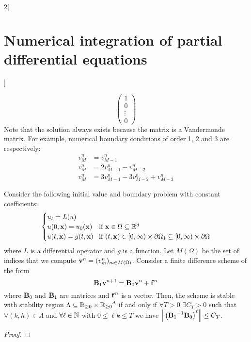 \documentclass[../../../main_math.tex]{subfiles}
\begin{document}
\begin{multicols}{2}[\section{Numerical integration of partial differential equations}]
\begin{definition}
$$\begin{pmatrix}
        1      \\
        0      \\
        \vdots \\
        0
      \end{pmatrix}
    $$
    Note that the solution always exists because the matrix is a Vandermonde matrix.
    For example, numerical boundary conditions of order 1, 2 and 3 are respectively:
    \begin{align*}
      v_M^{n} & =v_{M-1}^{n}                           \\
      v_M^n   & =2v_{M-1}^{n}-v_{M-2}^{n}              \\
      v_M^n   & =3v_{M-1}^{n}-3v_{M-2}^{n}+v_{M-3}^{n}
    \end{align*}
  \end{definition}
  \begin{proposition}\label{NIPDE:preLax}
    Consider the following initial value and boundary problem with constant coefficients:
    \begin{equation}\label{NIPDE:eqLax}
      \begin{cases}
        u_t=L(u)                                                                                                                    \\
        u(0,\boldsymbol{\mathrm{x}})=u_0(\boldsymbol{\mathrm{x}}) & \!\text{if }\boldsymbol{\mathrm{x}}\in\Omega \subseteq\mathbb{R}^d                                                        \\
        u(t,\boldsymbol{\mathrm{x}})=g(t,\boldsymbol{\mathrm{x}}) & \!\text{if }(t,\boldsymbol{\mathrm{x}})\in[0,\infty)\times\partial\Omega_1\subseteq [0,\infty)\times\partial\Omega
      \end{cases}
    \end{equation}
    where $L$ is a differential operator and $g$ is a function. Let $M(\Omega)$ be the set of indices that we compute $\boldsymbol{\mathrm{v}}^n=(v_m^n)_{m\in M(\Omega)}$. Consider a finite difference scheme of the form
    \begin{equation}\label{NIPDE:eqpreLax}
      \boldsymbol{\mathrm{B}}_1\boldsymbol{\mathrm{v}}^{n+1}=\boldsymbol{\mathrm{B}}_0\boldsymbol{\mathrm{v}}^n+\boldsymbol{\mathrm{f}}^n
    \end{equation}
    where $\boldsymbol{\mathrm{B}}_0$ and $\boldsymbol{\mathrm{B}}_1$ are matrices and $\boldsymbol{\mathrm{f}}^n$ is a vector. Then, the scheme is stable with stability region $\Lambda\subseteq \mathbb{R}_{\geq 0}\times{\ensuremath{\mathbb{R}}_{\geq 0}}^d$ if and only if $\forall T>0$ $\exists C_T>0$ such that $\forall (k,h)\in\Lambda$ and $\forall \ell\in\mathbb{N}$ with $0\leq \ell k\leq T$ we have $\left\|{\left({\boldsymbol{\mathrm{B}}_1}^{-1}\boldsymbol{\mathrm{B}}_0\right)}^\ell\right\|\leq C_T$.
  \end{proposition}
  \begin{proof}

\end{proof}
\end{multicols}
\end{document}
